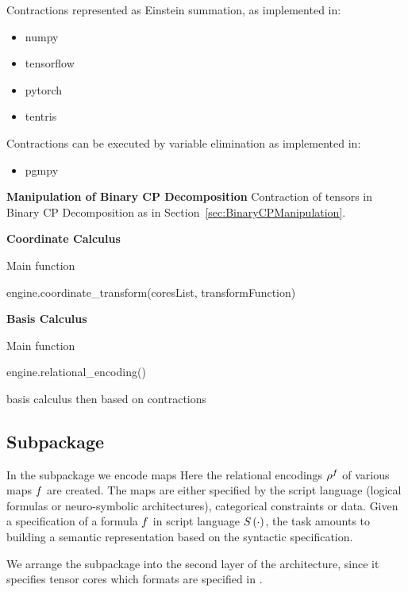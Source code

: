 Contractions represented as Einstein summation, as implemented in:
\begin{itemize}
	\item numpy
	\item tensorflow
	\item pytorch
	\item tentris
\end{itemize}

Contractions can be executed by variable elimination as implemented in:
\begin{itemize}
	\item pgmpy
\end{itemize}

\textbf{Manipulation of Binary CP Decomposition}
Contraction of tensors in Binary CP Decomposition as in Section~\ref{sec:BinaryCPManipulation}.

\textbf{Coordinate Calculus}

Main function
\begin{centeredcode}
	engine.coordinate\_transform(coresList, transformFunction)
\end{centeredcode}

\textbf{Basis Calculus}

Main function 
\begin{centeredcode}
	engine.relational\_encoding()
\end{centeredcode}
basis calculus then based on contractions





\subsection{Subpackage \spencoding}

In the \spencoding subpackage we encode maps 
Here the relational encodings $\rho^{f}$ of various maps $f$ are created.
%
The maps are either specified by the script language (logical formulas or neuro-symbolic architectures), categorical constraints or data.
Given a specification of a formula $f$ in script language $S\left(\cdot\right)$, the task amounts to building a semantic representation based on the syntactic specification.

We arrange the \spencoding subpackage into the second layer of the \tnreason architecture, since it specifies tensor cores which formats are specified in \spengine.


